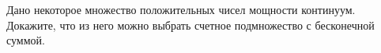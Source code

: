 \documentclass{article}
\begin{document}
Дано некоторое множество положительных чисел мощности континуум. Докажите, что из него можно выбрать счетное подмножество с бесконечной суммой.
\end{document}
